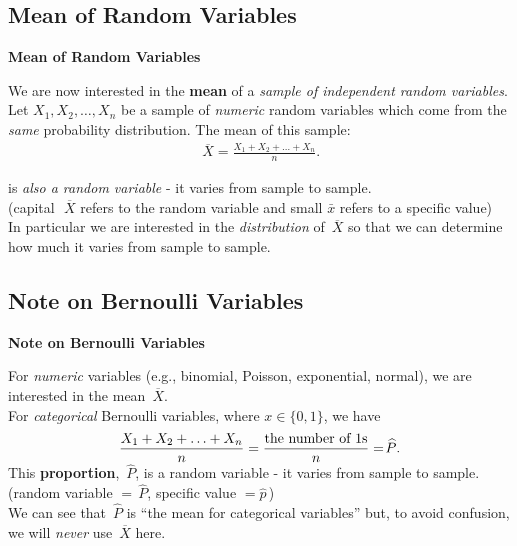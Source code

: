 \documentclass[compress]{beamer}        %
\makeatletter
\newcommand{\tcb}{\textcolor{beamer@blendedblue}}
\makeatother
\begin{document}
\subsection{Mean of Random Variables}
\begin{frame}{\bf \tcb{Mean of Random Variables}}

We are now interested in the {\bf mean} of a \emph{sample of independent random variables}.\\[0.6cm]

Let $X_1,X_2,\ldots,X_n$ be a sample of \emph{numeric} random variables which come from the \emph{same} probability distribution. The mean of this sample:\\[-0.1cm]

\begin{align*}
\,\overline{\!X} = \frac{X_1+X_2+\ldots+X_n}{n}.
\end{align*}

is \emph{also a random variable} - it varies from sample to sample.\\ {\footnotesize(capital $\,\,\overline{\!X}$ refers to the random variable and small $\bar x$ refers to a specific value)}\\[0.6cm]

In particular we are interested in the \emph{distribution} of $\,\overline{\!X}$ so that we can determine how much it varies from sample to sample.

\end{frame}


\subsection{Note on Bernoulli Variables}
\begin{frame}{\bf \tcb{Note on Bernoulli Variables}}

For \emph{numeric} variables (e.g., binomial, Poisson, exponential, normal), we are interested in the mean $\,\overline{\!X}$.\\[0.8cm]

For \emph{categorical} Bernoulli variables, where $x \in \{0,1\}$, we have \\[-0.1cm]
\begin{align*}
\frac{X_1+X_2+\ldots+X_n}{n} = \frac{\text{the number of 1s}}{n} = {\boldmath\widehat{\!P}}.\\[-0.2cm]
\end{align*}
This {\bf proportion}, $\,\widehat{\!P}$, is a random variable - it varies from sample to sample. {\footnotesize(random variable  $= \,\widehat{\!P}$, specific value $= \hat p$\,)}\\[0.8cm]

We can see that $\,\widehat{\!P}$ is ``the mean for categorical variables'' but, to avoid confusion, we will \emph{never} use $\,\overline{\!X}$ here.
\end{frame}
\end{document}
